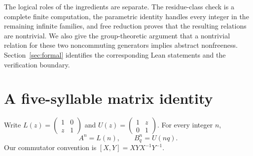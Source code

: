 \documentclass[11pt]{article}
\theoremstyle{definition}
\theoremstyle{remark}
\numberwithin{equation}{section}
\begin{document}
The logical roles of the ingredients are separate. The residue-class
check is a complete finite computation, the parametric identity
handles every integer in the remaining infinite families, and free
reduction proves that the resulting relations are nontrivial.
We also give the group-theoretic argument that a nontrivial relation
for these two noncommuting generators implies abstract nonfreeness.
Section~\ref{sec:formal} identifies the corresponding Lean statements
and the verification boundary.

\section{A five-syllable matrix identity}\label{sec:identity}
Write $L(z)=\left(\begin{smallmatrix}1&0\\z&1\end{smallmatrix}\right)$
and $U(z)=\left(\begin{smallmatrix}1&z\\0&1\end{smallmatrix}\right)$.
For every integer $n$,
\begin{equation}\label{eq:powers}
 A^n=L(n),\qquad B_q^n=U(nq).
\end{equation}
Our commutator convention is $[X,Y]=XYX^{-1}Y^{-1}$.
\end{document}
